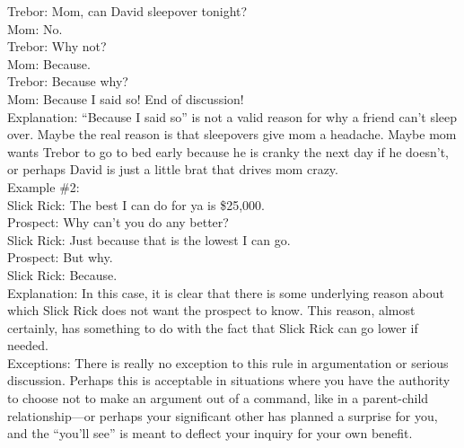 \documentclass[a4paper,12pt,single,pdftex]{scrartcl}
\begin{document}
    
      Trebor: Mom, can David sleepover tonight?
    \\

    
      Mom: No.
    \\

    
      Trebor:  Why not?
    \\

    
      Mom: Because.
    \\

    
      Trebor: Because why?
    \\

    
      Mom: Because I said so!  End of discussion!
    \\

    
      Explanation: “Because I said so” is not a valid reason for why a friend can’t sleep over.  Maybe the real reason is that sleepovers give mom a headache.  Maybe mom wants Trebor to go to bed early because he is cranky the next day if he doesn’t, or perhaps David is just a little brat that drives mom crazy.
    \\

    
      Example \#2:
    \\

    
      Slick Rick: The best I can do for ya is \$25,000.
    \\

    
      Prospect: Why can’t you do any better?
    \\

    
      Slick Rick: Just because that is the lowest I can go.
    \\

    
      Prospect: But why.
    \\

    
      Slick Rick: Because.
    \\

    
      Explanation: In this case, it is clear that there is some underlying reason about which Slick Rick does not want the prospect to know.  This reason, almost certainly, has something to do with the fact that Slick Rick can go lower if needed.
    \\

    
      Exceptions: There is really no exception to this rule in argumentation or serious discussion.  Perhaps this is acceptable in situations where you have the authority to choose not to make an argument out of a command, like in a parent-child relationship—or perhaps your significant other has planned a surprise for you, and the “you’ll see” is meant to deflect your inquiry for your own benefit.
    \\
\end{document}

